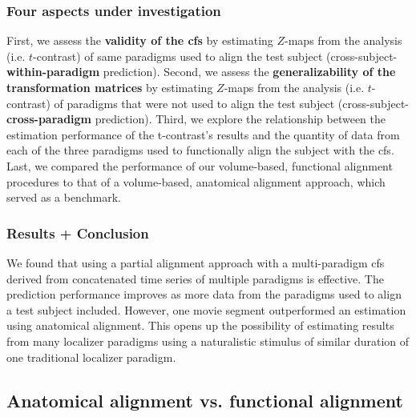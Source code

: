 \subsubsection{Four aspects under investigation}



%
First, we assess the \textbf{validity of the \ac{cfs}} by estimating $Z$-maps
from the analysis (i.e. $t$-contrast) of same paradigms used to align the test
subject (cross-subject-\textbf{within-paradigm} prediction).
%
Second, we assess the \textbf{generalizability of the transformation matrices}
by estimating $Z$-maps from the analysis (i.e. $t$-contrast) of paradigms that
were not used to align the test subject (cross-subject-\textbf{cross-paradigm}
prediction).
%
Third, we explore the relationship between the estimation performance of the
t-contrast's results and the quantity of data from each of the three paradigms
used to functionally align the subject with the \ac{cfs}.
%
Last, we compared the performance of our volume-based, functional alignment
procedures to that of a volume-based, anatomical alignment approach, which
served as a benchmark.


\subsubsection{Results + Conclusion}
%
We found that using a partial alignment approach with a multi-paradigm \ac{cfs}
derived from concatenated time series of multiple paradigms is effective.
%
The prediction performance improves as more data from the paradigms used to
align a test subject included.
%
However, one movie segment outperformed an estimation using anatomical
alignment.
%
This opens up the possibility of estimating results from many localizer
paradigms using a naturalistic stimulus of similar duration of one traditional
localizer paradigm.



\subsection{Anatomical alignment vs. functional alignment}

